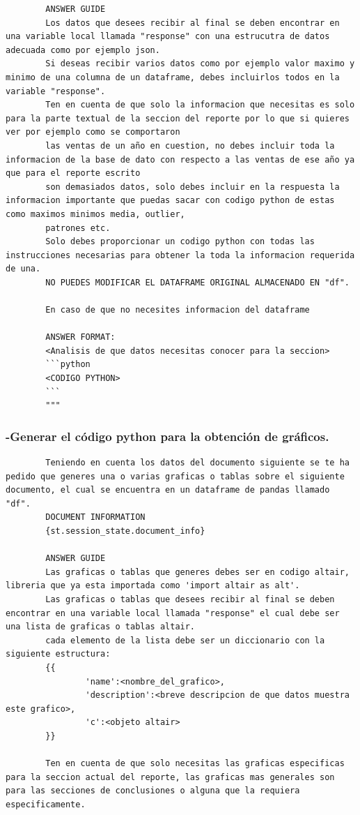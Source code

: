 \begin{anexos}
\begin{lstlisting}
		ANSWER GUIDE
		Los datos que desees recibir al final se deben encontrar en una variable local llamada "response" con una estrucutra de datos adecuada como por ejemplo json.
		Si deseas recibir varios datos como por ejemplo valor maximo y minimo de una columna de un dataframe, debes incluirlos todos en la variable "response".
		Ten en cuenta de que solo la informacion que necesitas es solo para la parte textual de la seccion del reporte por lo que si quieres ver por ejemplo como se comportaron
		las ventas de un año en cuestion, no debes incluir toda la informacion de la base de dato con respecto a las ventas de ese año ya que para el reporte escrito
		son demasiados datos, solo debes incluir en la respuesta la informacion importante que puedas sacar con codigo python de estas como maximos minimos media, outlier,
		patrones etc.
		Solo debes proporcionar un codigo python con todas las instrucciones necesarias para obtener la toda la informacion requerida de una.
		NO PUEDES MODIFICAR EL DATAFRAME ORIGINAL ALMACENADO EN "df".
		
		En caso de que no necesites informacion del dataframe
		
		ANSWER FORMAT:
		<Analisis de que datos necesitas conocer para la seccion>
		```python
		<CODIGO PYTHON>
		```
		"""
	\end{lstlisting}
	
	\subsubsection{-Generar el código python para la obtención de gráficos.}
	\begin{lstlisting}
		Teniendo en cuenta los datos del documento siguiente se te ha pedido que generes una o varias graficas o tablas sobre el siguiente documento, el cual se encuentra en un dataframe de pandas llamado "df".
		DOCUMENT INFORMATION
		{st.session_state.document_info}
		
		ANSWER GUIDE
		Las graficas o tablas que generes debes ser en codigo altair, libreria que ya esta importada como 'import altair as alt'.
		Las graficas o tablas que desees recibir al final se deben encontrar en una variable local llamada "response" el cual debe ser una lista de graficas o tablas altair.
		cada elemento de la lista debe ser un diccionario con la siguiente estructura:
		{{
				'name':<nombre_del_grafico>,
				'description':<breve descripcion de que datos muestra este grafico>,
				'c':<objeto altair>
		}}
		
		Ten en cuenta de que solo necesitas las graficas especificas para la seccion actual del reporte, las graficas mas generales son para las secciones de conclusiones o alguna que la requiera especificamente.
		

\end{lstlisting}
\end{anexos}
